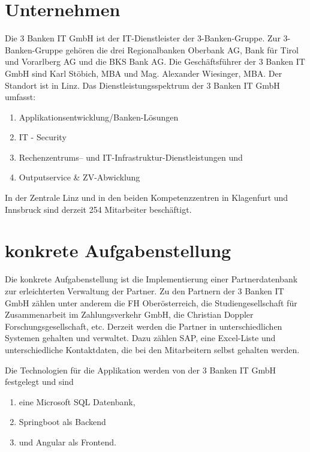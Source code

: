 \documentclass[master,german]{hgbthesis}
\begin{document}
\section{Unternehmen}
Die 3 Banken IT GmbH ist der IT-Dienstleister der 3-Banken-Gruppe. Zur 3-Banken-Gruppe gehören die drei Regionalbanken Oberbank AG, Bank für Tirol und Vorarlberg AG und die BKS Bank AG.
Die Geschäftsführer der 3 Banken IT GmbH sind Karl Stöbich, MBA und Mag. Alexander Wiesinger, MBA. Der Standort ist in Linz.
Das Dienstleistungsspektrum der 3 Banken IT GmbH umfasst: \newline
\begin{enumerate}
	\item Applikationsentwicklung/Banken-Lösungen
	\item IT - Security
	\item Rechenzentrums– und IT-Infrastruktur-Dienstleistungen und
	\item Outputservice \& ZV-Abwicklung \newline
\end{enumerate} 

In der Zentrale Linz und in den beiden Kompetenzzentren in Klagenfurt und Innsbruck sind derzeit 254 Mitarbeiter beschäftigt.
\cite{3BankenIT}

\section{konkrete Aufgabenstellung}
Die konkrete Aufgabenstellung ist die Implementierung einer Partnerdatenbank zur erleichterten Verwaltung der Partner. Zu den Partnern der 3 Banken IT GmbH zählen unter anderem die FH Oberösterreich, die Studiengesellschaft für Zusammenarbeit im Zahlungsverkehr GmbH, die Christian Doppler Forschungsgesellschaft, etc.
Derzeit werden die Partner in unterschiedlichen Systemen gehalten und verwaltet. Dazu zählen SAP, eine Excel-Liste und unterschiedliche Kontaktdaten, die bei den Mitarbeitern selbst gehalten werden.

Die Technologien für die Applikation werden von der 3 Banken IT GmbH festgelegt und sind\newline
\begin{enumerate}
	\item eine Microsoft SQL Datenbank,
	\item Springboot als Backend
	\item und Angular als Frontend. \newline 
\end{enumerate}
\end{document}
